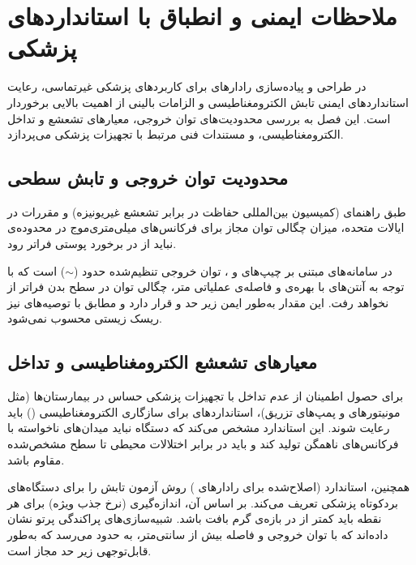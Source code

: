 \section{ملاحظات ایمنی و انطباق با استانداردهای پزشکی}
\label{sec:safety-standards}

در طراحی و پیاده‌سازی رادارهای  برای کاربردهای پزشکی غیرتماسی، رعایت استانداردهای ایمنی تابش الکترومغناطیسی و الزامات بالینی از اهمیت بالایی برخوردار است. این فصل به بررسی محدودیت‌های توان خروجی، معیارهای تشعشع و تداخل الکترومغناطیسی، و مستندات فنی مرتبط با تجهیزات پزشکی می‌پردازد.

\subsection{محدودیت توان خروجی و تابش سطحی}
\label{sec:power-density-limits}

طبق راهنمای  (کمیسیون بین‌المللی حفاظت در برابر تشعشع غیر‌یونیزه) و مقررات  در ایالات متحده، میزان چگالی توان مجاز برای فرکانس‌های میلی‌متری‌موج در محدوده‌ی  نباید از  در برخورد پوستی فراتر رود.

در سامانه‌های مبتنی بر چیپ‌های  و ، توان خروجی تنظیم‌شده حدود  ($\sim$) است که با توجه به آنتن‌های با بهره‌ی  و فاصله‌ی عملیاتی  متر، چگالی توان در سطح بدن فراتر از  نخواهد رفت. این مقدار به‌طور ایمن زیر حد  و  قرار دارد و مطابق با توصیه‌های  نیز ریسک زیستی محسوب نمی‌شود.

\subsection{معیارهای تشعشع الکترومغناطیسی و تداخل}
\label{sec:emc-sar}

برای حصول اطمینان از عدم تداخل با تجهیزات پزشکی حساس در بیمارستان‌ها (مثل مونیتورهای  و پمپ‌های تزریق)، استانداردهای  برای سازگاری الکترومغناطیسی () باید رعایت شوند. این استاندارد مشخص می‌کند که دستگاه نباید میدان‌های ناخواسته با فرکانس‌های ناهمگن تولید کند و باید در برابر اختلالات محیطی تا سطح مشخص‌شده مقاوم باشد.

همچنین، استاندارد  (اصلاح‌شده برای رادارهای ) روش آزمون تابش را برای دستگاه‌های بردکوتاه پزشکی تعریف می‌کند. بر اساس آن، اندازه‌گیری  (نرخ جذب ویژه) برای هر نقطه باید کمتر از  در بازه‌ی  گرم بافت باشد. شبیه‌سازی‌های پراکندگی پرتو نشان داده‌اند که با توان خروجی  و فاصله بیش از  سانتی‌متر،  به حدود  می‌رسد که به‌طور قابل‌توجهی زیر حد مجاز است.

